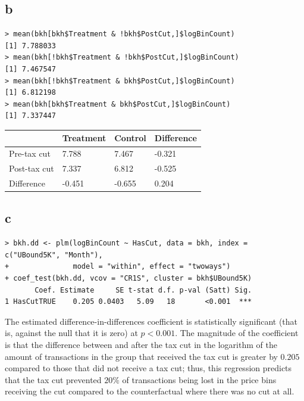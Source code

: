 \documentclass[12pt,letterpaper]{article}
\theoremstyle{definition}
\begin{document}
\subsection*{b}

\begin{Verbatim}[fontsize=\small]
> mean(bkh[bkh$Treatment & !bkh$PostCut,]$logBinCount)
[1] 7.788033
> mean(bkh[!bkh$Treatment & !bkh$PostCut,]$logBinCount)
[1] 7.467547
> mean(bkh[!bkh$Treatment & bkh$PostCut,]$logBinCount)
[1] 6.812198
> mean(bkh[bkh$Treatment & bkh$PostCut,]$logBinCount)
[1] 7.337447
\end{Verbatim}

\begin{table}[H]
  \centering
  \begin{tabular}{lll|l}
    \toprule
    & Treatment & Control & Difference \\
    \midrule
    Pre-tax cut & 7.788 & 7.467 & -0.321 \\
    Post-tax cut & 7.337 & 6.812 & -0.525 \\
    \midrule
    Difference & -0.451 & -0.655  & 0.204 \\
    \bottomrule
  \end{tabular}
\end{table}

\subsection*{c}

\begin{Verbatim}[fontsize=\small]
> bkh.dd <- plm(logBinCount ~ HasCut, data = bkh, index = c("UBound5K", "Month"),
+               model = "within", effect = "twoways")
+ coef_test(bkh.dd, vcov = "CR1S", cluster = bkh$UBound5K)
       Coef. Estimate     SE t-stat d.f. p-val (Satt) Sig.
1 HasCutTRUE    0.205 0.0403   5.09   18       <0.001  ***
\end{Verbatim}

The estimated difference-in-differences coefficient is statistically significant (that is, against the null that it is zero) at $p < 0.001$. The magnitude of the coefficient is that the difference between and after the tax cut in the logarithm of the amount of transactions in the group that received the tax cut is greater by $0.205$ compared to those that did not receive a tax cut; thus, this regression predicts that the tax cut prevented $20\%$ of transactions being lost in the price bins receiving the cut compared to the counterfactual where there was no cut at all.
\end{document}
